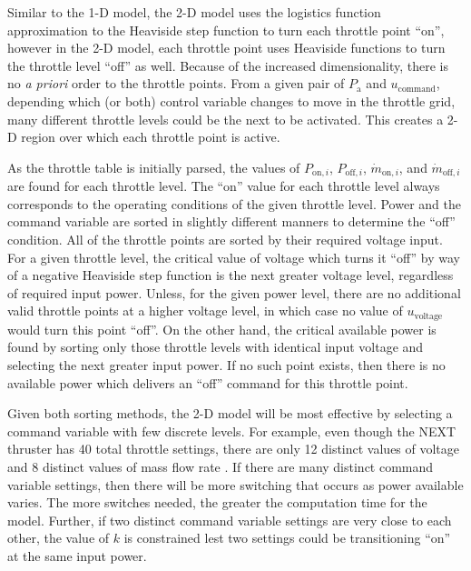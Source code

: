 Similar to the 1-D model, the 2-D model uses the logistics function approximation to the Heaviside step function to turn each throttle point ``on'', however in the 2-D model, each throttle point uses Heaviside functions to turn the throttle level ``off'' as well. Because of the increased dimensionality, there is no \textit{a priori} order to the throttle points. From a given pair of $P_\textrm{a}$ and $u_{\textrm{command}}$, depending which (or both) control variable changes to move in the throttle grid, many different throttle levels could be the next to be activated. This creates a 2-D region over which each throttle point is active.

As the throttle table is initially parsed, the values of $P_{\textrm{on},i}$, $P_{\textrm{off},i}$, $\dot{m}_{\textrm{on},i}$, and  $\dot{m}_{\textrm{off},i}$ are found for each throttle level. The ``on'' value for each throttle level always corresponds to the operating conditions of the given throttle level. Power and the command variable are sorted in slightly different manners to determine the ``off'' condition. All of the throttle points are sorted by their required voltage input. For a given throttle level, the critical value of voltage which turns it ``off'' by way of a negative Heaviside step function is the next greater voltage level, regardless of required input power. Unless, for the given power level, there are no additional valid throttle points at a higher voltage level, in which case no value of $u_{\textrm{voltage}}$ would turn this point ``off''. On the other hand, the critical available power is found by sorting only those throttle levels with identical input voltage and selecting the next greater input power. If no such point exists, then there is no available power which delivers an ``off'' command for this throttle point. 

Given both sorting methods, the 2-D model will be most effective by selecting a command variable with few discrete levels. For example, even though the \ac{NEXT} thruster has 40 total throttle settings, there are only 12 distinct values of voltage and 8 distinct values of mass flow rate \cite{NEXTTT11}. If there are many distinct command variable settings, then there will be more switching that occurs as power available varies. The more switches needed, the greater the computation time for the model. Further, if two distinct command variable settings are very close to each other, the value of $k$ is constrained lest two settings could be transitioning ``on'' at the same input power. 

